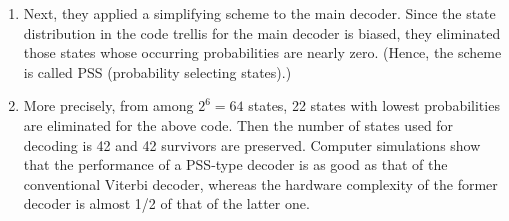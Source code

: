 \documentclass[fontsize=12pt]{article}
\theoremstyle{definition}
\begin{document}
\begin{enumerate}
\item Next,
they applied a simplifying scheme to the main decoder. Since
the state distribution in the code trellis for the main decoder is
biased, they eliminated those states whose occurring probabilities
are nearly zero. (Hence, the scheme is called PSS (probability
selecting states).) 

\item More precisely, from among $2^6 = 64$
states, 22 states with lowest probabilities are eliminated for
the above code. Then the number of states used for decoding
is 42 and 42 survivors are preserved. Computer simulations
show that the performance of a PSS-type decoder is as good as
that of the conventional Viterbi decoder, whereas the hardware
complexity of the former decoder is almost 1/2 of that of the
latter one.
\end{enumerate}
\end{document}

